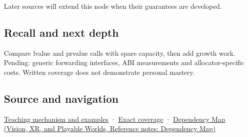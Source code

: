 \hypertarget{appendix-d5908f75721f-used-by}{}

Later sources will extend this node when their guarantees are developed.

\subsection{Recall and next depth}\label{appendix-d5908f75721f-recall-and-next-depth}

\hypertarget{appendix-d5908f75721f-recall-and-next-depth}{}

Compare lvalue and prvalue calls with spare capacity, then add growth work. Pending: generic forwarding interfaces, ABI measurements and allocator-specific costs. Written coverage does not demonstrate personal mastery.

\subsection{Source and navigation}\label{appendix-d5908f75721f-source-and-navigation}

\hypertarget{appendix-d5908f75721f-source-and-navigation}{}

\hyperref[01-foundations-i-ch003-a-value-crosses-the-function-boundary]{Teaching mechanism and examples} · \hyperref[appendix-fd090d982a15-m009---parts-127-147]{Exact coverage} · \href{../07-Vision-XR-and-Playable-Worlds/main.pdf\#nameddest=appendix-4ad47bdd269a}{Dependency Map (Vision, XR, and Playable Worlds, Reference notes: Dependency Map)}

